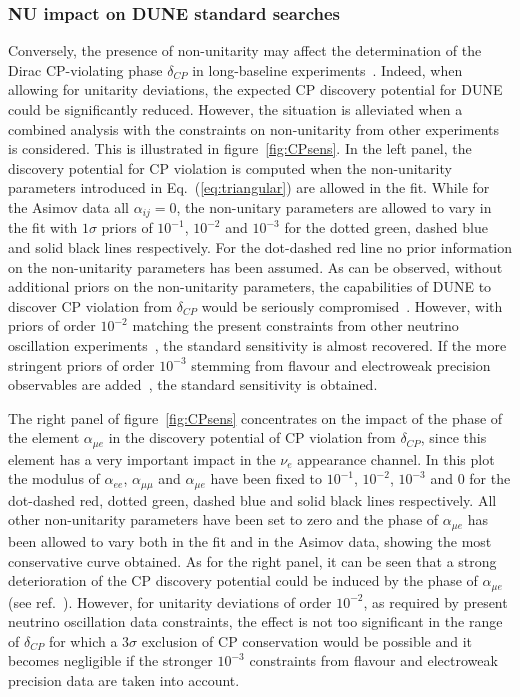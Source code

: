 \subsubsection{NU impact on DUNE standard searches}
Conversely, the presence of non-unitarity may affect the determination of the
Dirac CP-violating phase $\delta_{CP}$ in long-baseline experiments~\cite{Miranda:2016wdr,Fernandez-Martinez:2016lgt,Escrihuela:2016ube}.
 Indeed, when allowing for unitarity deviations, the expected CP discovery potential for DUNE could be significantly reduced.
However, the situation is alleviated when a combined analysis with the constraints on non-unitarity from other experiments is considered. This is illustrated in figure~\ref{fig:CPsens}. In the left panel, the discovery potential for CP violation is computed when the non-unitarity parameters introduced in Eq.~(\ref{eq:triangular}) are allowed in the fit. While for the Asimov data all $\alpha_{ij}=0$, the non-unitary parameters are allowed to vary in the fit with $1 \sigma$ priors of $10^{-1}$, $10^{-2}$ and $10^{-3}$ for the dotted green, dashed blue and solid black lines respectively. For the dot-dashed red line no prior information on the non-unitarity parameters has been assumed. As can be observed, without additional priors on the non-unitarity parameters, the capabilities of DUNE to discover CP violation from $\delta_{CP}$ would be seriously compromised~\cite{Escrihuela:2016ube}. However, with priors of order $10^{-2}$ matching the present constraints from other neutrino oscillation experiments~\cite{Escrihuela:2016ube,Blennow:2016jkn}, the standard sensitivity is almost recovered. If the more stringent priors of order $10^{-3}$ stemming from flavour and electroweak precision observables are added~\cite{Antusch:2014woa,Fernandez-Martinez:2016lgt}, the standard sensitivity is obtained.   

The right panel of figure~\ref{fig:CPsens} concentrates on the impact of the phase of the element $\alpha_{\mu e}$ in the discovery potential of CP violation from $\delta_{CP}$, since this element has a very important impact in the $\nu_e$ appearance channel. In this plot the modulus of $\alpha_{ee}$, $\alpha_{\mu \mu}$ and $\alpha_{\mu e}$ have been fixed to $10^{-1}$, $10^{-2}$, $10^{-3}$ and 0 for the dot-dashed red, dotted green, dashed blue and solid black lines respectively. All other non-unitarity parameters have been set to zero and the phase of $\alpha_{\mu e}$ has been allowed to vary both in the fit and in the Asimov data, showing the most conservative curve obtained. As for the right panel, it can be seen that a strong deterioration of the CP discovery potential could be induced by the phase of $\alpha_{\mu e}$ (see ref.~\cite{Escrihuela:2016ube}). However, for unitarity deviations of order $10^{-2}$, as required by present neutrino oscillation data constraints, the effect is not too significant in the range of $\delta_{CP}$ for which a $3 \sigma$ exclusion of CP conservation would be possible and it becomes negligible if the stronger $10^{-3}$ constraints from flavour and electroweak precision data are taken into account.  

